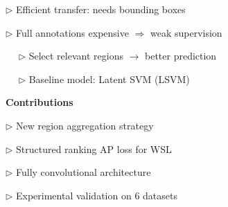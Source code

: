 \documentclass[landscape,a0paper,fontscale=0.292]{baposter}
\begin{document}
\begin{poster}
{$\triangleright$ Efficient transfer: needs bounding boxes
 

$\triangleright$ Full annotations expensive $\Rightarrow$ weak supervision

~~ $\triangleright$ Select relevant regions $\rightarrow$ better prediction

~~ $\triangleright$ Baseline model: Latent SVM (LSVM)


\vspace{2mm}
\textbf{Contributions}

$\triangleright$ New region aggregation strategy

$\triangleright$ Structured ranking AP loss for WSL %

$\triangleright$ Fully convolutional architecture 

$\triangleright$ Experimental validation on 6 datasets

}

% 
% 
% 
% 
% 
% 
% 
% 
% 

\end{poster}
\end{document}
